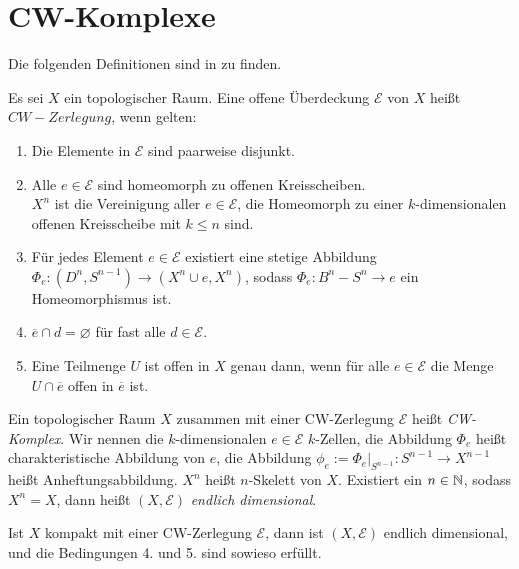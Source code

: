 \section{CW-Komplexe}

Die folgenden Definitionen sind in \cite{dold} zu finden.

\begin{definition}
    \label{def: cw-komplex}
    Es sei $X$ ein topologischer Raum. Eine offene Überdeckung $\mathcal{E}$ von $X$ heißt 
    $CW-Zerlegung$, wenn gelten:
    \begin{enumerate}
        \item Die Elemente in $\mathcal{E}$ sind paarweise disjunkt.
        \item Alle $e \in \mathcal{E}$ sind homeomorph zu offenen Kreisscheiben. \\
            $X^n$ ist die Vereinigung aller $e \in \mathcal{E}$, die Homeomorph zu einer
            $k$-dimensionalen offenen Kreisscheibe mit $k \leq n$ sind.
        \item Für jedes Element $e \in \mathcal{E}$ existiert eine stetige Abbildung
            $\Phi_e \colon (D^n, S^{n - 1}) \to (X^n \cup e, X^n)$, sodass 
            $\Phi_e \colon B^n - S^n \to e$ ein Homeomorphismus ist. 
        \item $\overline{e} \cap d = \varnothing$ für fast alle $d \in \mathcal{E}$.
        \item Eine Teilmenge $U$ ist offen in $X$ genau dann, wenn für alle $e \in \mathcal{E}$ die
            Menge $U \cap \overline{e}$ offen in $\overline{e}$ ist. 
    \end{enumerate}
    
    Ein topologischer Raum $X$ zusammen mit einer CW-Zerlegung $\mathcal{E}$ heißt 
    \textit{CW-Komplex}.
    Wir nennen die $k$-dimensionalen $e \in \mathcal{E}$ $k$-Zellen, die Abbildung $\Phi_e$
    heißt charakteristische Abbildung von $e$, die Abbildung 
    $\phi_e := \Phi_e|_{S^{n - 1}} \colon S^{n - 1} \to X^{n - 1}$ heißt Anheftungsabbildung.
    $X^n$ heißt $n$-Skelett von $X$. Existiert ein $n \in { \mathbb N }$, sodass $X^n = X$, dann heißt
    $(X, \mathcal{E})$ \textit{endlich dimensional}.
\end{definition}

\begin{remark}
    Ist $X$ kompakt mit einer CW-Zerlegung $\mathcal{E}$, dann ist $(X, \mathcal{E})$ endlich 
    dimensional, und die Bedingungen 4. und 5. sind sowieso erfüllt.
\end{remark}

